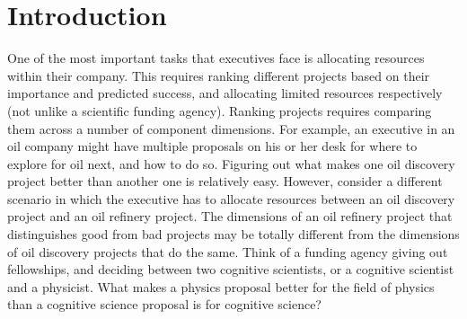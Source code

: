 \documentclass[a4paper, nobind, dvipsnames]{templates/ociamthesis}
\theoremstyle{definition}
\theoremstyle{definition}
\theoremstyle{definition}
\theoremstyle{definition}
\theoremstyle{remark}
\begin{document}
\minitoc

\hypertarget{introduction-2}{%
\section{Introduction}\label{introduction-2}}

One of the most important tasks that executives face is allocating resources
within their company. This requires ranking different projects based on their
importance and predicted success, and allocating limited resources respectively
(not unlike a scientific funding agency). Ranking projects requires comparing
them across a number of component dimensions. For example, an executive in an
oil company might have multiple proposals on his or her desk for where to
explore for oil next, and how to do so. Figuring out what makes one oil
discovery project better than another one is relatively easy. However, consider
a different scenario in which the executive has to allocate resources between an
oil discovery project and an oil refinery project. The dimensions of an oil
refinery project that distinguishes good from bad projects may be totally
different from the dimensions of oil discovery projects that do the same. Think
of a funding agency giving out fellowships, and deciding between two cognitive
scientists, or a cognitive scientist and a physicist. What makes a physics
proposal better for the field of physics than a cognitive science proposal is
for cognitive science?
\end{document}
